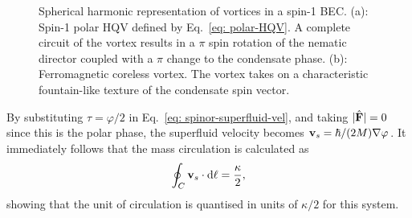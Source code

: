 \begin{figure}
    \centering
    \caption[Spherical harmonic representation of spin-1 vortices]
    {\label{fig: spin-1-vortices}Spherical harmonic representation of vortices
        in a spin-1 BEC\@.
        (a): Spin-1 polar HQV defined by Eq.~\eqref{eq: polar-HQV}.
        A complete circuit of the vortex results in a \(\pi \) spin rotation of
        the nematic director coupled with a \(\pi \) change to the condensate
        phase.
        (b): Ferromagnetic coreless vortex.
        The vortex takes on a characteristic fountain-like texture of the
        condensate spin vector.}
\end{figure}
By substituting \(\tau=\varphi/2\) in Eq.~\eqref{eq: spinor-superfluid-vel},
and taking \(|\hat{\vb{F}}|=0\) since this is the polar phase, the superfluid
velocity becomes \(\vb{v}_s = \hbar/(2M)\nabla\varphi \).
It immediately follows that the mass circulation is calculated as
\begin{align}
    \oint_C \vb{v}_s \cdot \dd \vb{\ell} = \frac{\kappa}{2},
\end{align}
showing that the unit of circulation is quantised in units of \(\kappa / 2\) for
this system.

